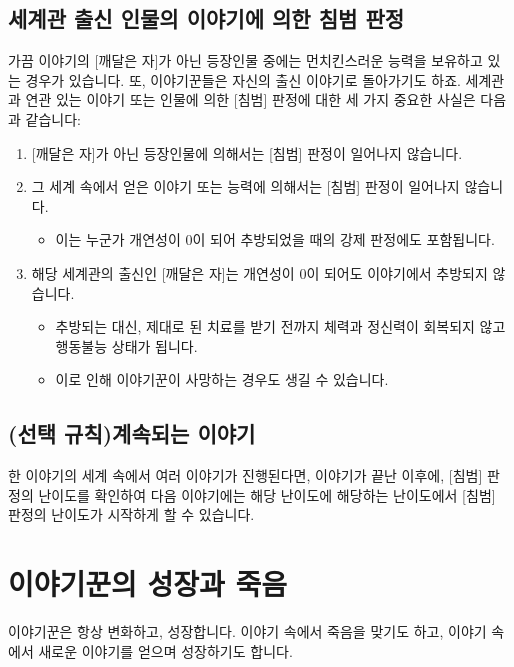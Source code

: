 \documentclass[12pt]{report}
\begin{document}
	\section*{세계관 출신 인물의 이야기에 의한 침범 판정}
	가끔 이야기의 [깨달은 자]가 아닌 등장인물 중에는 먼치킨스러운 능력을 보유하고 있는 경우가 있습니다. 또, 이야기꾼들은 자신의 출신 이야기로 돌아가기도 하죠. 세계관과 연관 있는 이야기 또는 인물에 의한 [침범] 판정에 대한 세 가지 중요한 사실은 다음과 같습니다:
	\begin{enumerate}
		\item {}[깨달은 자]가 아닌 등장인물에 의해서는 [침범] 판정이 일어나지 않습니다.
		\item 그 세계 속에서 얻은 이야기 또는 능력에 의해서는 [침범] 판정이 일어나지 않습니다.
		\begin{itemize}
			\item 이는 누군가 개연성이 0이 되어 추방되었을 때의 강제 판정에도 포함됩니다.
		\end{itemize}
		\item 해당 세계관의 출신인 [깨달은 자]는 개연성이 0이 되어도 이야기에서 추방되지 않습니다.
		\begin{itemize}
			\item 추방되는 대신, 제대로 된 치료를 받기 전까지 체력과 정신력이 회복되지 않고 행동불능 상태가 됩니다.
			\item 이로 인해 이야기꾼이 사망하는 경우도 생길 수 있습니다.
		\end{itemize}
	\end{enumerate}
	
	\section*{(선택 규칙)계속되는 이야기}
	한 이야기의 세계 속에서 여러 이야기가 진행된다면, 이야기가 끝난 이후에, [침범] 판정의 난이도를 확인하여 다음 이야기에는 해당 난이도에 해당하는 난이도에서 [침범] 판정의 난이도가 시작하게 할 수 있습니다.
	
	\chapter{이야기꾼의 성장과 죽음}
	이야기꾼은 항상 변화하고, 성장합니다. 이야기 속에서 죽음을 맞기도 하고, 이야기 속에서 새로운 이야기를 얻으며 성장하기도 합니다.
	
\end{document}
